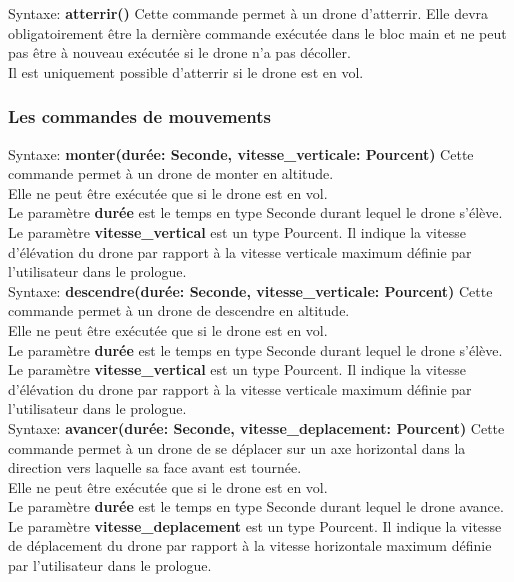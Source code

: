 \documentclass[12pt]{article}
\begin{document}
		\quad Syntaxe: \textbf{atterrir()}\bigbreak
			Cette commande permet à un drone d'atterrir. Elle devra obligatoirement être la dernière commande exécutée dans le bloc main et ne peut pas être à nouveau exécutée si le drone n'a pas décoller. \\
			Il est uniquement possible d'atterrir si le drone est en vol.

	\subsubsection{Les commandes de mouvements}

		\quad Syntaxe: \textbf{monter(durée: Seconde, vitesse\_verticale: Pourcent)} \bigbreak
			Cette commande permet à un drone de monter en altitude. \\
			Elle ne peut être exécutée que si le drone est en vol. \\
			Le paramètre \textbf{durée} est le temps en type Seconde durant lequel le drone s'élève. \\
			Le paramètre \textbf{vitesse\_vertical} est un type Pourcent. Il indique la vitesse d'élévation du drone par rapport à la vitesse verticale maximum définie par l'utilisateur dans le prologue. \\

		\quad Syntaxe: \textbf{descendre(durée: Seconde, vitesse\_verticale: Pourcent)} \bigbreak
			Cette commande permet à un drone de descendre en altitude. \\
			Elle ne peut être exécutée que si le drone est en vol.\\
			Le paramètre \textbf{durée} est le temps en type Seconde durant lequel le drone s'élève. \\
			Le paramètre \textbf{vitesse\_vertical} est un type Pourcent. Il indique la vitesse d'élévation du drone par rapport à la vitesse verticale maximum définie par l'utilisateur dans le prologue. \\

		
		\quad Syntaxe: \textbf{avancer(durée: Seconde, vitesse\_deplacement: Pourcent)}  \bigbreak
			Cette commande permet à un drone de se déplacer sur un axe horizontal dans la direction vers laquelle sa face avant est tournée. \\
			Elle ne peut être exécutée que si le drone est en vol.\\
			Le paramètre \textbf{durée} est le temps en type Seconde durant lequel le drone avance. \\
			Le paramètre \textbf{vitesse\_deplacement} est un type Pourcent. Il indique la vitesse de déplacement du drone par rapport à la vitesse horizontale maximum définie par l'utilisateur dans le prologue.  \\
\end{document}

